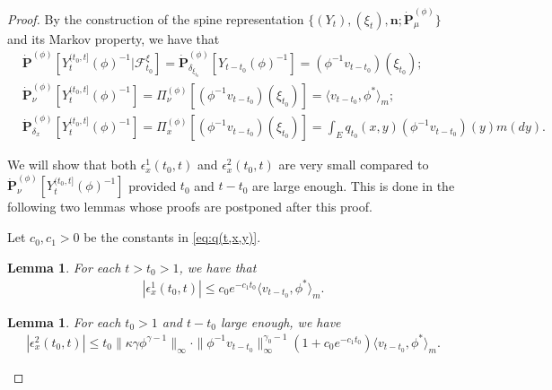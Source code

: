 \documentclass[12pt,a4paper]{amsart}
\newtheorem{lem}[thm]{Lemma}
\theoremstyle{definition}
\numberwithin{equation}{section}
\begin{document}
\begin{proof}
  By the construction of the spine representation $\{(Y_t), (\xi_t),\mathbf n; \dot {\mathbf P}^{(\phi)}_\mu\}$ and its Markov property, we have that
  \begin{align}
    \label{eq: some equations for PY-1-1}
    &\dot{\mathbf P}^{(\phi)} [Y_t^{(t_0,t]}(\phi)^{-1}|\mathscr F^\xi_{t_0}]
      = \dot{\mathbf P}_{\delta_{\xi_{t_0}}}^{(\phi)}  [Y_{t-t_0}(\phi)^{-1}]
      = (\phi^{-1}v_{t-t_0})(\xi_{t_0});
    \\ \label{eq: some equations for PY-1-2}
    &\dot{\mathbf P}_\nu^{(\phi)}[Y_t^{(t_0,t]}(\phi)^{-1}]
      = \Pi_{\nu}^{(\phi)}[(\phi^{-1}v_{t-t_0})(\xi_{t_0}) ]
      = \langle v_{t-t_0},\phi^* \rangle_m;
    \\ \label{eq: some equations for PY-1-3}
    &\dot{\mathbf P}_{\delta_x}^{(\phi)}[Y_t^{(t_0,t]}(\phi)^{-1}]
      = \Pi_x^{(\phi)}[(\phi^{-1}v_{t-t_0})(\xi_{t_0}) ]
      = \int_E  q_{t_0}(x,y)(\phi^{-1}v_{t-t_0})(y) m(dy).
  \end{align}

  We will show that both $\epsilon_x^1(t_0,t)$ and $\epsilon_x^2(t_0,t)$ are very small compared to $\dot {\mathbf P}_\nu^{(\phi)}[Y_t^{(t_0,t]}(\phi)^{-1}]$ provided $t_0$ and $t- t_0$ are large enough.
  This is done in the following two lemmas whose proofs are postponed after this proof.

  Let $c_0, c_1>0$ be the constants in \eqref{eq:q(t,x,y)}.
  \begin{lem}
    \label{lem:bound_for_epsilon1}
    For each $t > t_0 > 1$, we have that
    \begin{align}
      |\epsilon_x^1(t_0,t)|
      \leq c_0 e^{-c_1 t_0}\langle v_{t-t_0},\phi^* \rangle_m.
    \end{align}
  \end{lem}
  
  \begin{lem}
    \label{lem:upperbound_of_epsilon-2}
    For each $t_0 > 1$ and $t - t_0$ large enough, we have
    \begin{align}
      \label{eq:upperbound_of_epsilon-2}
      |\epsilon_x^2(t_0,t)|
      \leq t_0\|\kappa\gamma\phi^{\gamma - 1}\|_{\infty} \cdot \|\phi^{-1}v_{t-t_0}\|^{\gamma_0-1}_\infty (1+c_0 e^{-c_1 t_0}) \langle v_{t-t_0},\phi^* \rangle_m.
    \end{align}
  \end{lem}


\end{proof}
\end{document}
